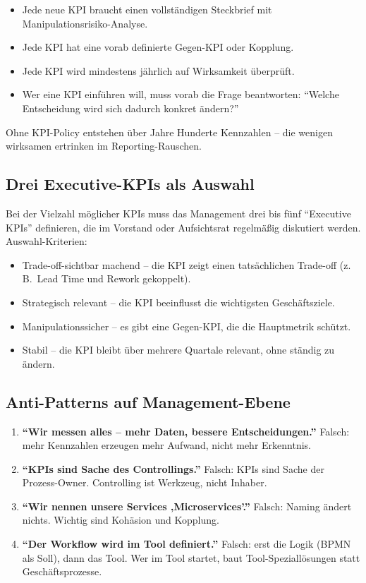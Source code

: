 \documentclass[11pt,a4paper,oneside]{article}
\newcommand{\fachbegriff}[1]{\textbf{#1}}
\begin{document}
\begin{itemize}
  \item Jede neue KPI braucht einen vollständigen Steckbrief mit Manipulations\-risiko-Analyse.
  \item Jede KPI hat eine vorab definierte Gegen-KPI oder Kopplung.
  \item Jede KPI wird mindestens jährlich auf Wirksamkeit überprüft.
  \item Wer eine KPI einführen will, muss vorab die Frage beantworten: ``Welche Entscheidung wird sich dadurch konkret ändern?''
\end{itemize}

Ohne KPI-Policy entstehen über Jahre Hunderte Kennzahlen -- die wenigen wirksamen ertrinken im Reporting-Rauschen.

\subsection{Drei Executive-KPIs als Auswahl}

Bei der Vielzahl möglicher KPIs muss das Management drei bis fünf ``Executive KPIs'' definieren, die im Vorstand oder Aufsichtsrat regelmäßig diskutiert werden. Auswahl-Kriterien:

\begin{itemize}
  \item Trade-off-sichtbar machend -- die KPI zeigt einen tatsächlichen Trade-off (z.\,B.\ Lead Time und Rework gekoppelt).
  \item Strategisch relevant -- die KPI beeinflusst die wichtigsten Geschäftsziele.
  \item Manipulationssicher -- es gibt eine Gegen-KPI, die die Hauptmetrik schützt.
  \item Stabil -- die KPI bleibt über mehrere Quartale relevant, ohne ständig zu ändern.
\end{itemize}

\subsection{Anti-Patterns auf Management-Ebene}

\begin{enumerate}
  \item \fachbegriff{``Wir messen alles -- mehr Daten, bessere Entscheidungen.''} Falsch: mehr Kennzahlen erzeugen mehr Aufwand, nicht mehr Erkenntnis.
  \item \fachbegriff{``KPIs sind Sache des Controllings.''} Falsch: KPIs sind Sache der Prozess-Owner. Controlling ist Werkzeug, nicht Inhaber.
  \item \fachbegriff{``Wir nennen unsere Services ‚Microservices'.''} Falsch: Naming ändert nichts. Wichtig sind Kohäsion und Kopplung.
  \item \fachbegriff{``Der Workflow wird im Tool definiert.''} Falsch: erst die Logik (BPMN als Soll), dann das Tool. Wer im Tool startet, baut Tool-Speziallösungen statt Geschäftsprozesse.
\end{enumerate}
\end{document}
